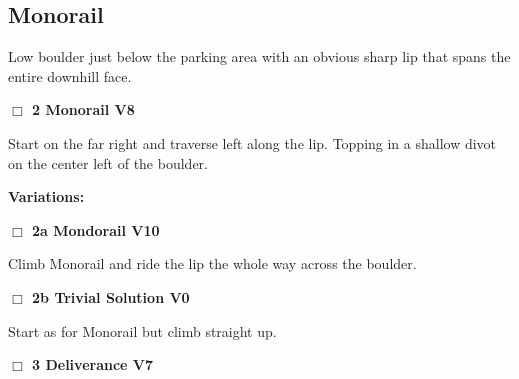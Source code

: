 	\begin{multicols}{2}

\needspace{10em}
\subsection*{Monorail}\label{bf:Monorail}

Low boulder just below the parking area with an obvious sharp lip that spans the entire downhill face.\\



\needspace{2em}
\label{rt:Monorail}
\colorbox{Goldenrod!20}{
\parbox{0.95\linewidth}{
\hspace{-1ex}\textbf{$\Box$
2 Monorail V8  
}}}
\begin{adjustwidth}{1.3em}{}			

Start on the far right and traverse left along the lip. Topping in a shallow divot on the center left of the boulder.
\end{adjustwidth}


\begin{adjustwidth}{0.5cm}{}				
\needspace{4em}
\textbf{Variations:} \newline

\needspace{2em}
\label{vr:Monorail Extension Project}
\colorbox{red!20}{
\parbox{0.95\linewidth}{
\hspace{-1ex}\textbf{$\Box$
2a Mondorail V10  
}}}
\begin{adjustwidth}{1.3em}{}			

Climb Monorail and ride the lip the whole way across the boulder.
\end{adjustwidth}




\needspace{2em}
\label{vr:Trivial Solution}
\colorbox{green!20}{
\parbox{0.95\linewidth}{
\hspace{-1ex}\textbf{$\Box$
2b Trivial Solution V0  
}}}
\begin{adjustwidth}{1.3em}{}			

Start as for Monorail but climb straight up.
\end{adjustwidth}



\end{adjustwidth}


\needspace{2em}
\label{rt:Deliverance}
\colorbox{Goldenrod!20}{
\parbox{0.95\linewidth}{
\hspace{-1ex}\textbf{$\Box$
3 Deliverance V7  
}}}
\begin{adjustwidth}{1.3em}{}			


\end{adjustwidth}
\end{multicols}
